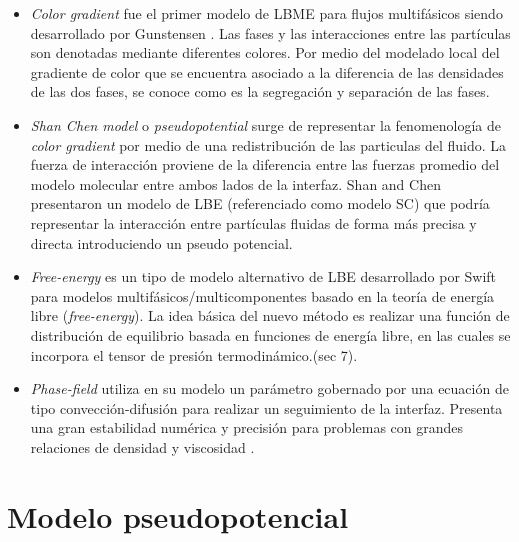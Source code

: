 \begin{itemize}
	
	\item \textit{Color gradient} fue el primer modelo de LBME para flujos multifásicos siendo desarrollado por Gunstensen \cite{gunstensen1991lattice}. Las fases y las interacciones entre las partículas son denotadas mediante diferentes colores. Por medio del modelado local del gradiente de color que se encuentra asociado a la diferencia de las densidades de las dos fases, se conoce como es la segregación y separación de las fases.
	
	\item \textit{Shan Chen model} o \textit{pseudopotential} surge de representar la fenomenología de \textit{color gradient} por medio de una redistribución de las particulas del fluido. La fuerza de interacción proviene de la diferencia entre las fuerzas promedio del modelo molecular  entre ambos lados de la interfaz. Shan and Chen \cite{shan1993lattice} presentaron un modelo de LBE (referenciado como modelo SC) que podría representar la interacción entre partículas fluidas de forma más precisa y directa introduciendo un pseudo potencial. 
	
	\item \textit{Free-energy} es un tipo de modelo alternativo de LBE desarrollado por Swift \cite{swift1995lattice} para modelos multifásicos/multicomponentes basado en la teoría de energía libre (\textit{free-energy}). La idea básica del nuevo método es realizar una función de distribución de equilibrio basada en funciones de energía libre, en las cuales se incorpora el tensor de presión termodinámico.\cite{guo2013lattice}(sec 7).
	
	\item \textit{Phase-field} utiliza en su modelo un parámetro gobernado por una ecuación de tipo convección-difusión para realizar un seguimiento de la interfaz. Presenta una gran estabilidad numérica y precisión para problemas con grandes relaciones de densidad y viscosidad \cite{wang2019brief}.
	

	
\end{itemize}





\section{Modelo pseudopotencial}

